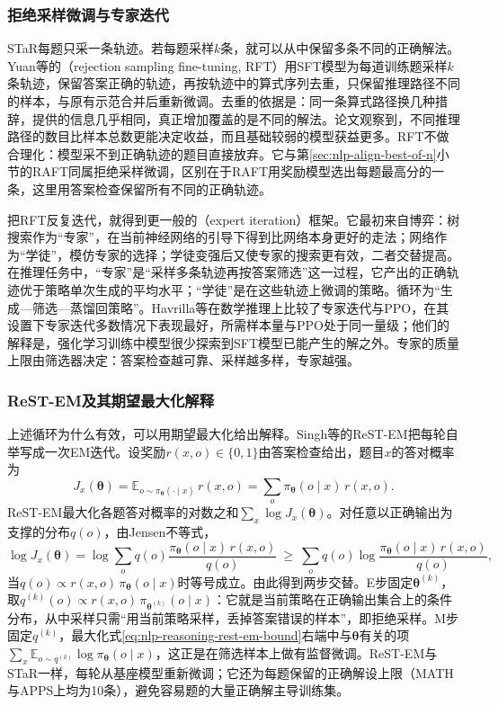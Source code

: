 \subsubsection{拒绝采样微调与专家迭代}
\label{sec:nlp-reasoning-rft}

STaR每题只采一条轨迹。若每题采样$k$条，就可以从中保留多条不同的正确解法。Yuan等的（rejection sampling fine-tuning, RFT）用SFT模型为每道训练题采样$k$条轨迹，保留答案正确的轨迹，再按轨迹中的算式序列去重，只保留推理路径不同的样本，与原有示范合并后重新微调。去重的依据是：同一条算式路径换几种措辞，提供的信息几乎相同，真正增加覆盖的是不同的解法。论文观察到，不同推理路径的数目比样本总数更能决定收益，而且基础较弱的模型获益更多。RFT不做合理化：模型采不到正确轨迹的题目直接放弃。它与第\ref{sec:nlp-align-best-of-n}小节的RAFT同属拒绝采样微调，区别在于RAFT用奖励模型选出每题最高分的一条，这里用答案检查保留所有不同的正确轨迹。

把RFT反复迭代，就得到更一般的（expert iteration）框架。它最初来自博弈：树搜索作为“专家”，在当前神经网络的引导下得到比网络本身更好的走法；网络作为“学徒”，模仿专家的选择；学徒变强后又使专家的搜索更有效，二者交替提高。在推理任务中，“专家”是“采样多条轨迹再按答案筛选”这一过程，它产出的正确轨迹优于策略单次生成的平均水平；“学徒”是在这些轨迹上微调的策略。循环为“生成—筛选—蒸馏回策略”。Havrilla等在数学推理上比较了专家迭代与PPO，在其设置下专家迭代多数情况下表现最好，所需样本量与PPO处于同一量级；他们的解释是，强化学习训练中模型很少探索到SFT模型已能产生的解之外。专家的质量上限由筛选器决定：答案检查越可靠、采样越多样，专家越强。

\subsubsection{ReST-EM及其期望最大化解释}
\label{sec:nlp-reasoning-rest-em}

上述循环为什么有效，可以用期望最大化给出解释。Singh等的ReST-EM把每轮自举写成一次EM迭代。设奖励$r(x,o)\in\{0,1\}$由答案检查给出，题目$x$的答对概率为
\[
  J_x(\bm\theta)=\mathbb E_{o\sim\pi_{\bm\theta}(\cdot\mid x)}\,r(x,o)=\sum_o\pi_{\bm\theta}(o\mid x)\,r(x,o).
\]
ReST-EM最大化各题答对概率的对数之和$\sum_x\log J_x(\bm\theta)$。对任意以正确输出为支撑的分布$q(o)$，由Jensen不等式，
\begin{equation}
  \log J_x(\bm\theta)=\log\sum_o q(o)\frac{\pi_{\bm\theta}(o\mid x)\,r(x,o)}{q(o)}
  \ \ge\ \sum_o q(o)\log\frac{\pi_{\bm\theta}(o\mid x)\,r(x,o)}{q(o)},
  \label{eq:nlp-reasoning-rest-em-bound}
\end{equation}
当$q(o)\propto r(x,o)\,\pi_{\bm\theta}(o\mid x)$时等号成立。由此得到两步交替。E步固定$\bm\theta^{(k)}$，取$q^{(k)}(o)\propto r(x,o)\,\pi_{\bm\theta^{(k)}}(o\mid x)$：它就是当前策略在正确输出集合上的条件分布，从中采样只需“用当前策略采样，丢掉答案错误的样本”，即拒绝采样。M步固定$q^{(k)}$，最大化式\eqref{eq:nlp-reasoning-rest-em-bound}右端中与$\bm\theta$有关的项$\sum_x\mathbb E_{o\sim q^{(k)}}\log\pi_{\bm\theta}(o\mid x)$，这正是在筛选样本上做有监督微调。ReST-EM与STaR一样，每轮从基座模型重新微调；它还为每题保留的正确解设上限（MATH与APPS上均为10条），避免容易题的大量正确解主导训练集。


